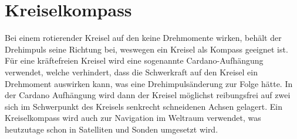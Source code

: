 

\section{Kreiselkompass}
Bei einem rotierender Kreisel auf den keine Drehmomente wirken, behält der Drehimpuls seine Richtung bei, weswegen ein Kreisel als Kompass geeignet ist. Für eine kräftefreien Kreisel wird eine sogenannte \dq Cardano-Aufhängung\dq{} verwendet, welche verhindert, dass die Schwerkraft auf den Kreisel ein Drehmoment auswirken kann, was eine Drehimpulsänderung zur Folge hätte. In der Cardano Aufhängung wird dann der Kreisel möglichst reibungsfrei auf zwei sich im Schwerpunkt des Kreisels senkrecht schneidenen Achsen gelagert. Ein Kreiselkompass wird auch zur Navigation im Weltraum verwendet, was heutzutage schon in Satelliten und Sonden umgesetzt wird.

